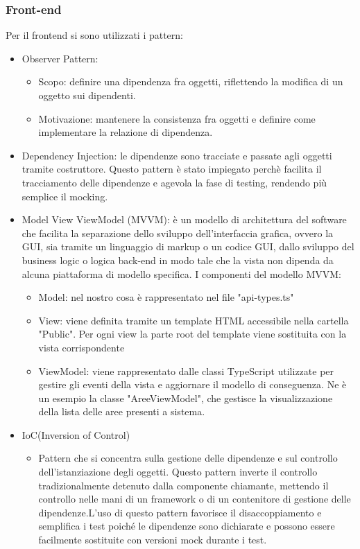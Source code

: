 \documentclass[12pt]{article}
\begin{document}
\subsubsection{Front-end}
Per il frontend si sono utilizzati i pattern:
\begin{itemize}
	\item Observer Pattern:
	\begin{itemize}
		\item Scopo: definire una dipendenza fra oggetti, riflettendo la modifica di un oggetto sui dipendenti.
		\item Motivazione: mantenere la consistenza fra oggetti e definire come implementare la relazione di dipendenza.
	\end{itemize}
	\item Dependency Injection: le dipendenze sono tracciate e passate agli oggetti tramite costruttore.
	 Questo pattern è stato impiegato perchè facilita il tracciamento delle dipendenze e agevola la fase di testing, rendendo più semplice il mocking.
	\item Model View ViewModel (MVVM): è un modello di architettura del software che facilita la separazione dello sviluppo dell'interfaccia grafica, ovvero la GUI,
sia tramite un linguaggio di markup o un codice GUI, dallo sviluppo del business logic o logica back-end in modo tale che la vista non dipenda da alcuna piattaforma di modello specifica.
I componenti del modello MVVM:	
	\begin{itemize}
		\item Model: nel nostro cosa è rappresentato nel file "api-types.ts"
		\item View: viene definita tramite un template HTML accessibile nella cartella "Public". Per ogni view la parte root del template viene sostituita con la vista corrispondente
		\item ViewModel: viene rappresentato dalle classi TypeScript utilizzate per gestire gli eventi della vista e aggiornare il modello di conseguenza. Ne è un esempio la classe "AreeViewModel", che gestisce la visualizzazione della lista delle aree presenti a sistema.
	\end{itemize}
\item IoC(Inversion of Control)
	\begin{itemize}
		\item Pattern che si concentra sulla gestione delle dipendenze e sul controllo dell'istanziazione degli oggetti. Questo pattern inverte il controllo tradizionalmente detenuto dalla 				componente chiamante, mettendo il controllo nelle mani di un framework o di un contenitore di gestione delle dipendenze.L'uso di questo pattern favorisce il disaccoppiamento e 				semplifica i test poiché le dipendenze sono dichiarate e possono essere facilmente sostituite con versioni mock durante i test.
	\end{itemize}
\end{itemize}
\end{document}
